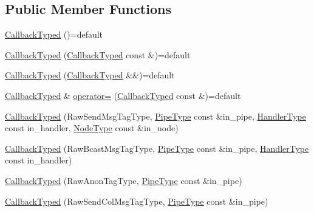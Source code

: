 \subsection*{Public Member Functions}
\begin{DoxyCompactItemize}
\item 
\hyperlink{structvt_1_1pipe_1_1callback_1_1cbunion_1_1_callback_typed_a98d90baa0ff16d16c1918810edce406f}{Callback\+Typed} ()=default
\item 
\hyperlink{structvt_1_1pipe_1_1callback_1_1cbunion_1_1_callback_typed_afb15554d9e94dd6714ddfc0bf88e848c}{Callback\+Typed} (\hyperlink{structvt_1_1pipe_1_1callback_1_1cbunion_1_1_callback_typed}{Callback\+Typed} const \&)=default
\item 
\hyperlink{structvt_1_1pipe_1_1callback_1_1cbunion_1_1_callback_typed_a156131d8b268766113f8c2dd81b6a199}{Callback\+Typed} (\hyperlink{structvt_1_1pipe_1_1callback_1_1cbunion_1_1_callback_typed}{Callback\+Typed} \&\&)=default
\item 
\hyperlink{structvt_1_1pipe_1_1callback_1_1cbunion_1_1_callback_typed}{Callback\+Typed} \& \hyperlink{structvt_1_1pipe_1_1callback_1_1cbunion_1_1_callback_typed_a8a2b82218dbe268ee3ddef305654507b}{operator=} (\hyperlink{structvt_1_1pipe_1_1callback_1_1cbunion_1_1_callback_typed}{Callback\+Typed} const \&)=default
\item 
\hyperlink{structvt_1_1pipe_1_1callback_1_1cbunion_1_1_callback_typed_a1356407fa70109f76c0ab5fa415db743}{Callback\+Typed} (Raw\+Send\+Msg\+Tag\+Type, \hyperlink{namespacevt_ac9852acda74d1896f48f406cd72c7bd3}{Pipe\+Type} const \&in\+\_\+pipe, \hyperlink{namespacevt_af64846b57dfcaf104da3ef6967917573}{Handler\+Type} const in\+\_\+handler, \hyperlink{namespacevt_a866da9d0efc19c0a1ce79e9e492f47e2}{Node\+Type} const \&in\+\_\+node)
\item 
\hyperlink{structvt_1_1pipe_1_1callback_1_1cbunion_1_1_callback_typed_ac1ff87450b46cb1324c0b62ac1cca106}{Callback\+Typed} (Raw\+Bcast\+Msg\+Tag\+Type, \hyperlink{namespacevt_ac9852acda74d1896f48f406cd72c7bd3}{Pipe\+Type} const \&in\+\_\+pipe, \hyperlink{namespacevt_af64846b57dfcaf104da3ef6967917573}{Handler\+Type} const in\+\_\+handler)
\item 
\hyperlink{structvt_1_1pipe_1_1callback_1_1cbunion_1_1_callback_typed_a9923c7ce924c0f2d52cdd19a69dfcfec}{Callback\+Typed} (Raw\+Anon\+Tag\+Type, \hyperlink{namespacevt_ac9852acda74d1896f48f406cd72c7bd3}{Pipe\+Type} const \&in\+\_\+pipe)
\item 
\hyperlink{structvt_1_1pipe_1_1callback_1_1cbunion_1_1_callback_typed_a4ac5a9e8138b2dc50264533a5a7334ef}{Callback\+Typed} (Raw\+Send\+Col\+Msg\+Tag\+Type, \hyperlink{namespacevt_ac9852acda74d1896f48f406cd72c7bd3}{Pipe\+Type} const \&in\+\_\+pipe)

\end{DoxyCompactItemize}
